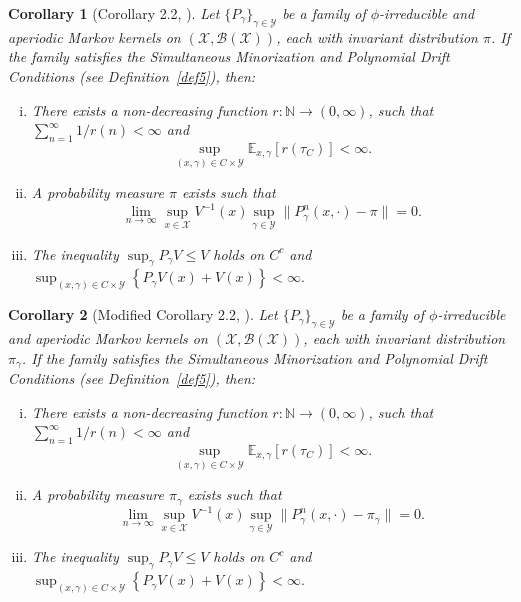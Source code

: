 \documentclass[pdflatex,sn-mathphys-num]{sn-jnl}
\renewcommand{\leq}{\leqslant}
\theoremstyle{thmstyleone}
\newtheorem{corollary}{Corollary}
\theoremstyle{thmstyletwo}
\theoremstyle{thmstylethree}
\begin{document}
\begin{corollary}[Corollary 2.2, \cite{atchade_limit_2010}]
Let \( \{P_\gamma\}_{\gamma \in \mathcal{Y}} \) be a family of \(\phi\)-irreducible and aperiodic Markov kernels on \( (\mathcal{X}, \mathcal{B}(\mathcal{X})) \), each with invariant distribution \( \pi \). If the family satisfies the \textit{Simultaneous Minorization and Polynomial Drift Conditions} (see Definition~\ref{def5}), then:
\begin{enumerate}[(i)]
    \item There exists a non-decreasing function \( r \colon \mathbb{N} \to (0, \infty) \), such that \( \sum_{n=1}^\infty 1/r(n) < \infty \) and
    \[
    \sup_{(x,\gamma) \in C \times \mathcal{Y}} \mathbb{E}_{x,\gamma}[r(\tau_C)] < \infty.
    \]
    \item A probability measure \( \pi \) exists such that
    \[
    \lim_{n \to \infty} \sup_{x \in \mathcal{X}} V^{-1}(x) \sup_{\gamma \in \mathcal{Y}} \|P_\gamma^n(x, \cdot) - \pi\| = 0.
    \]
    \item The inequality \( \sup_\gamma P_\gamma V \leq V \) holds on \( C^c \) and \(
    \sup_{(x,\gamma) \in C \times \mathcal{Y}} \left\{ P_\gamma V(x) + V(x) \right\} < \infty. \)
\end{enumerate}
\label{appendix:Corollary2}
\end{corollary}

\begin{corollary}[Modified Corollary 2.2, \cite{atchade_limit_2010}]
Let \( \{P_\gamma\}_{\gamma \in \mathcal{Y}} \) be a family of \(\phi\)-irreducible and aperiodic Markov kernels on \( (\mathcal{X}, \mathcal{B}(\mathcal{X})) \), each with invariant distribution \( \pi_\gamma \). If the family satisfies the \textit{Simultaneous Minorization and Polynomial Drift Conditions} (see Definition~\ref{def5}), then:
\begin{enumerate}[(i)]
    \item There exists a non-decreasing function \( r \colon \mathbb{N} \to (0, \infty) \), such that \( \sum_{n=1}^\infty 1/r(n) < \infty \) and
    \[
    \sup_{(x,\gamma) \in C \times \mathcal{Y}} \mathbb{E}_{x,\gamma}[r(\tau_C)] < \infty.
    \]
    \item A probability measure \( \pi_\gamma \) exists such that
    \[
    \lim_{n \to \infty} \sup_{x \in \mathcal{X}} V^{-1}(x) \sup_{\gamma \in \mathcal{Y}} \|P_\gamma^n(x, \cdot) - \pi_\gamma\| = 0.
    \]
    \item The inequality \( \sup_\gamma P_\gamma V \leq V \) holds on \( C^c \) and \(
    \sup_{(x,\gamma) \in C \times \mathcal{Y}} \left\{ P_\gamma V(x) + V(x) \right\} < \infty. \)
\end{enumerate}
\label{appendix:Corollary2bis}
\end{corollary}
\end{document}
